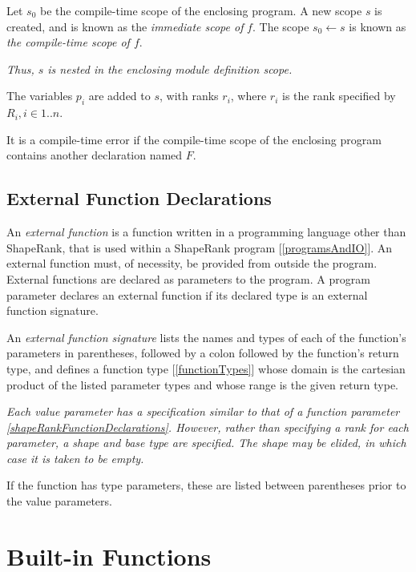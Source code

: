 \documentclass{article}
\begin{document}
 Let $s_0$ be the compile-time scope of the enclosing program. %
A new scope $s$ is created, and is known as the {\em immediate scope of} $f$. The scope $s_0 \leftarrow s$ is known as {\em the compile-time scope of $f$}.

{\em Thus, $s$ is nested in the enclosing module definition scope.}

The variables $p_i$ are added to $s$, with ranks $r_i$, where $r_i$ is the rank specified by $R_i, i \in 1..n$.

It is a compile-time error if the compile-time scope of the enclosing program contains another declaration named $F$.

\subsection{External Function Declarations}
\label{externalFunctionDeclarations}

An {\em external function} is a function written in a programming language other than ShapeRank, that is used within a ShapeRank program [\ref{programsAndIO}].
An external function must, of necessity, be provided from outside the program. External functions are declared as parameters to the program.  A program parameter declares an external function if its declared type is an external function signature.  

\ExternalFunctionSignature{}
\ExternalFunctionParameterList
\ExternalFunctionParameter
\ExternalFunctionTypeSigSuffix
\TypeParameterList
\TypeParameter

An {\em external function signature} lists the names and types of each of the function's parameters in parentheses, followed by a colon followed by the function's return type, and defines a  function type [\ref{functionTypes}] whose domain is the cartesian product of the listed parameter types and whose range is the given return type.

{\em Each value parameter has a specification similar to that of a function parameter \ref{shapeRankFunctionDeclarations}. However, rather than specifying a rank for each parameter, a shape and base type are specified. The shape may be elided, in which case it is taken to be empty.
} 

If the function has type parameters, these are listed between parentheses prior to the value parameters.


\section{Built-in Functions}
\label{builtinFunctions}
\end{document}
